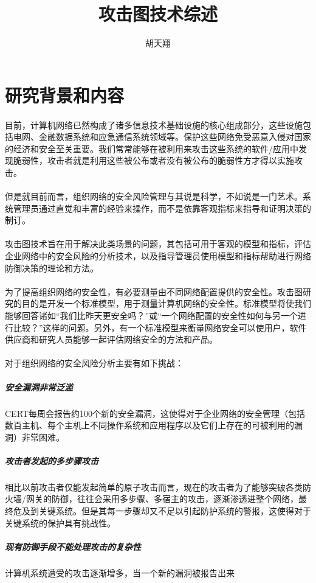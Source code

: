 \documentclass[12pt,a4paper]{article}
\title{攻击图技术综述}
\author{胡天翔}
\begin{document}
\maketitle

\section{研究背景和内容}

\paragraph{}
目前，计算机网络已然构成了诸多信息技术基础设施的核心组成部分，这些设施包括电网、金融数据系统和应急通信系统领域等。保护这些网络免受恶意入侵对国家的经济和安全至关重要。我们常常能够在被利用来攻击这些系统的软件/应用中发现脆弱性，攻击者就是利用这些被公布或者没有被公布的脆弱性方才得以实施攻击。
\paragraph{}
但是就目前而言，组织网络的安全风险管理与其说是科学，不如说是一门艺术。系统管理员通过直觉和丰富的经验来操作，而不是依靠客观指标来指导和证明决策的制订。
\paragraph{}
攻击图技术旨在用于解决此类场景的问题，其包括可用于客观的模型和指标，评估企业网络中的安全风险的分析技术，以及指导管理员使用模型和指标帮助进行网络防御决策的理论和方法。
\paragraph{}
为了提高组织网络的安全性，有必要测量由不同网络配置提供的安全性。攻击图研究的目的是开发一个标准模型，用于测量计算机网络的安全性。标准模型将使我们能够回答诸如“我们比昨天更安全吗？”或“一个网络配置的安全性如何与另一个进行比较？”这样的问题。另外，有一个标准模型来衡量网络安全可以使用户，软件供应商和研究人员能够一起评估网络安全的方法和产品。
\paragraph{}
对于组织网络的安全风险分析主要有如下挑战：
\subparagraph{安全漏洞非常泛滥}
CERT\cite{CERT}每周会报告约100个新的安全漏洞，这使得对于企业网络的安全管理（包括数百主机、每个主机上不同操作系统和应用程序以及它们上存在的可被利用的漏洞）非常困难。
\subparagraph{攻击者发起的多步骤攻击}
相比以前攻击者仅能发起简单的原子攻击而言，现在的攻击者为了能够突破各类防火墙/网关的防御，往往会采用多步骤、多宿主的攻击，逐渐渗透进整个网络，最终危及到关键系统。但是其每一步骤却又不足以引起防护系统的警报，这使得对于关键系统的保护具有挑战性。
\subparagraph{现有防御手段不能处理攻击的复杂性}计算机系统遭受的攻击逐渐增多，当一个新的漏洞被报告出来
\end{document}

